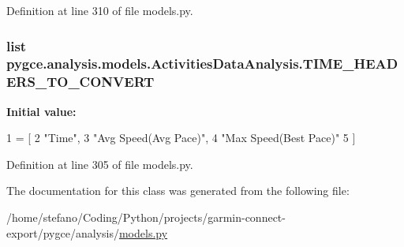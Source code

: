 Definition at line 310 of file models.\+py.

\subsubsection[{\texorpdfstring{T\+I\+M\+E\+\_\+\+H\+E\+A\+D\+E\+R\+S\+\_\+\+T\+O\+\_\+\+C\+O\+N\+V\+E\+RT}{TIME_HEADERS_TO_CONVERT}}]{\setlength{\rightskip}{0pt plus 5cm}list pygce.\+analysis.\+models.\+Activities\+Data\+Analysis.\+T\+I\+M\+E\+\_\+\+H\+E\+A\+D\+E\+R\+S\+\_\+\+T\+O\+\_\+\+C\+O\+N\+V\+E\+RT\hspace{0.3cm}{\ttfamily [static]}}\hypertarget{classpygce_1_1analysis_1_1models_1_1_activities_data_analysis_a2f0ccc7899b8c6b6d94391c80f5def1d}{}\label{classpygce_1_1analysis_1_1models_1_1_activities_data_analysis_a2f0ccc7899b8c6b6d94391c80f5def1d}
{\bfseries Initial value\+:}
\begin{DoxyCode}
1 = [
2         \textcolor{stringliteral}{"Time"},
3         \textcolor{stringliteral}{"Avg Speed(Avg Pace)"},
4         \textcolor{stringliteral}{"Max Speed(Best Pace)"}
5     ]
\end{DoxyCode}


Definition at line 305 of file models.\+py.



The documentation for this class was generated from the following file\+:\begin{DoxyCompactItemize}
\item 
/home/stefano/\+Coding/\+Python/projects/garmin-\/connect-\/export/pygce/analysis/\hyperlink{models_8py}{models.\+py}\end{DoxyCompactItemize}
